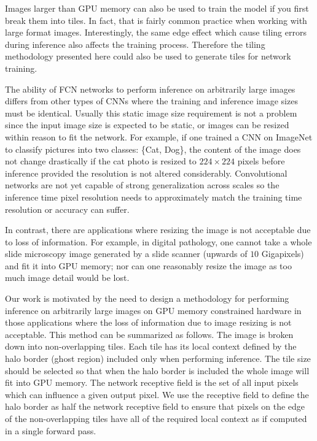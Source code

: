 \documentclass[10pt, indentfirst]{article}
\begin{document}
Images larger than GPU memory can also be used to train the model if you first break them into tiles.
In fact, that is fairly common practice when working with large format images.
Interestingly, the same edge effect which cause tiling errors during inference also affects the training process.
Therefore the tiling methodology presented here could also be used to generate tiles for network training.

The ability of FCN networks to perform inference on arbitrarily large images differs from other types of CNNs where the training and inference image sizes must be identical.
Usually this static image size requirement is not a problem since the input image size is expected to be static, or images can be resized within reason to fit the network.
For example, if one trained a CNN on ImageNet \citep{Russakovsky2015} to classify pictures into two classes: \{Cat, Dog\}, the content of the image does not change drastically if the cat photo is resized to $224 \times 224$ pixels before inference provided the resolution is not altered considerably.
Convolutional networks are not yet capable of strong generalization across scales \citep{Jaderberg2015,Lin2017a} so the inference time pixel resolution needs to approximately match the training time resolution or accuracy can suffer.

In contrast, there are applications where resizing the image is not acceptable due to loss of information.
For example, in digital pathology, one cannot take a whole slide microscopy image generated by a slide scanner (upwards of $\num{10}$ Gigapixels) and fit it into GPU memory; nor can one reasonably resize the image as too much image detail would be lost. 

Our work is motivated by the need to design a methodology for performing inference on arbitrarily large images on GPU memory constrained hardware in those applications where the loss of information due to image resizing is not acceptable.
This method can be summarized as follows.
The image is broken down into non-overlapping tiles.
Each tile has its local context defined by the halo border (ghost region) included only when performing inference.
The tile size should be selected so that when the halo border is included the whole image will fit into GPU memory.
The network receptive field \citep{araujo2019computing} is the set of all input pixels which can influence a given output pixel.
We use the receptive field to define the halo border as half the network receptive field to ensure that pixels on the edge of the non-overlapping tiles have all of the required local context as if computed in a single forward pass.
\end{document}
